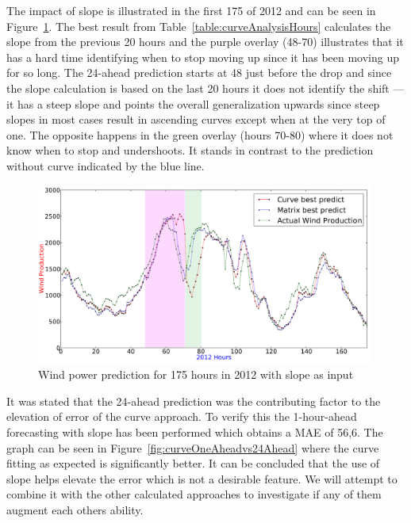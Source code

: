 The impact of slope is illustrated in the first 175 of 2012 and can be seen in Figure~\ref{fig:basicCurveAnalysisGrapho}. The best result from Table~\ref{table:curveAnalysisHours} calculates the slope from the previous 20 hours and the purple overlay (48-70) illustrates that it has a hard time identifying when to stop moving up since it has been moving up for so long. The 24-ahead prediction starts at 48 just before the drop and since the slope calculation is based on the last 20 hours it does not identify the shift --- it has a steep slope and points the overall generalization upwards since steep slopes in most cases result in ascending curves except when at the very top of one. The opposite happens in the green overlay (hours 70-80) where it does not know when to stop and undershoots. It stands in contrast to the prediction without curve indicated by the blue line.

\begin{figure}[H]
\centering
\includegraphics[width=0.99\textwidth]{billeder/curveAnalysisWindProduction.png}
\caption{Wind power prediction for 175 hours in 2012 with slope as input}
\label{fig:basicCurveAnalysisGrapho}
\end{figure} 

It was stated that the 24-ahead prediction was the contributing factor to the elevation of error of the curve approach. To verify this the 1-hour-ahead forecasting with slope has been performed which obtains a MAE of 56,6. The graph can be seen in Figure~\ref{fig:curveOneAheadvs24Ahead} where the curve fitting as expected is significantly better. It can be concluded that the use of slope helps elevate the error which is not a desirable feature. We will attempt to combine it with the other calculated approaches to investigate if any of them augment each others ability.

